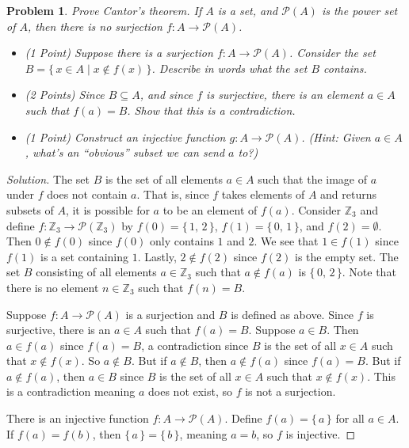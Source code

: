 \documentclass{article}
\theoremstyle{normal}
\newtheorem{problem}{Problem}
\begin{document}
    \clearpage
    \color{blue}
    \begin{problem}
        Prove Cantor's theorem. If $A$ is a set, and $\mathcal{P}(A)$ is the
        power set of $A$, then there is no surjection
        $f:A\rightarrow\mathcal{P}(A)$.
        \begin{itemize}
            \item (1 Point) Suppose there is a surjection
                $f:A\rightarrow\mathcal{P}(A)$. Consider the set
                $B=\{\,x\in{A}\;|\;x\notin{f}(x)\,\}$. Describe in words what
                the set $B$ contains.
            \item (2 Points) Since $B\subseteq{A}$, and since $f$ is surjective,
                there is an element $a\in{A}$ such that $f(a)=B$. Show that
                this is a contradiction.
            \item (1 Point) Construct an injective function
                $g:A\rightarrow\mathcal{P}(A)$. (Hint: Given $a\in{A}$, what's
                an ``obvious'' subset we can send $a$ to?) 
        \end{itemize}
    \end{problem}
    \color{black}
    \begin{proof}[Solution]
        The set $B$ is the set of all elements $a\in{A}$ such that the image of
        $a$ under $f$ does not contain $a$. That is, since $f$ takes elements
        of $A$ and returns subsets of $A$, it is possible for $a$ to be
        an element of $f(a)$. Consider $\mathbb{Z}_{3}$ and define
        $f:\mathbb{Z}_{3}\rightarrow\mathcal{P}(\mathbb{Z}_{3})$ by
        $f(0)=\{\,1,\,2\,\}$, $f(1)=\{\,0,\,1\,\}$, and
        $f(2)=\emptyset$. Then $0\notin{f}(0)$ since $f(0)$ only contains
        $1$ and $2$. We see that $1\in{f}(1)$ since $f(1)$ is a set containing
        $1$. Lastly, $2\notin{f}(2)$ since $f(2)$ is the empty set. The set
        $B$ consisting of all elements $a\in\mathbb{Z}_{3}$ such that
        $a\notin{f}(a)$ is $\{\,0,\,2\,\}$. Note that there is no element
        $n\in\mathbb{Z}_{3}$ such that $f(n)=B$.
        \par\hfill\par
        Suppose $f:A\rightarrow\mathcal{P}(A)$ is a surjection and $B$ is
        defined as above. Since $f$ is surjective, there is an $a\in{A}$
        such that $f(a)=B$. Suppose $a\in{B}$. Then $a\in{f}(a)$ since
        $f(a)=B$, a contradiction since $B$ is the set of all $x\in{A}$ such
        that $x\notin{f}(x)$. So $a\notin{B}$. But if $a\notin{B}$, then
        $a\notin{f}(a)$ since $f(a)=B$. But if $a\notin{f}(a)$, then
        $a\in{B}$ since $B$ is the set of all $x\in{A}$ such that
        $x\notin{f}(x)$. This is a contradiction meaning $a$ does not exist, so
        $f$ is not a surjection.
        \par\hfill\par
        There is an injective function $f:A\rightarrow\mathcal{P}(A)$.
        Define $f(a)=\{\,a\,\}$ for all $a\in{A}$. If
        $f(a)=f(b)$, then $\{\,a\,\}=\{\,b\,\}$, meaning $a=b$, so $f$
        is injective.
    \end{proof}
\end{document}

